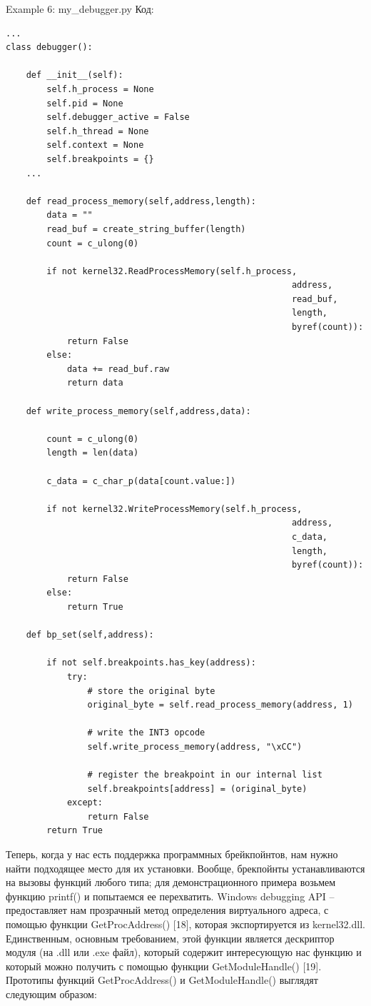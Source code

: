 \documentclass[12pt]{book}
\begin{document}
Example 6: my\_debugger.py
Код:
\begin{lstlisting}
...
class debugger():

    def __init__(self):
        self.h_process = None
        self.pid = None
        self.debugger_active = False
        self.h_thread = None
        self.context = None
        self.breakpoints = {}
    ...

    def read_process_memory(self,address,length):
        data = ""
        read_buf = create_string_buffer(length)
        count = c_ulong(0)

        if not kernel32.ReadProcessMemory(self.h_process,
                                                        address,
                                                        read_buf,
                                                        length,
                                                        byref(count)):
            return False
        else:
            data += read_buf.raw
            return data

    def write_process_memory(self,address,data):

        count = c_ulong(0)
        length = len(data)

        c_data = c_char_p(data[count.value:])

        if not kernel32.WriteProcessMemory(self.h_process,
                                                        address,
                                                        c_data,
                                                        length,
                                                        byref(count)):
            return False
        else:
            return True

    def bp_set(self,address):

        if not self.breakpoints.has_key(address):
            try:
                # store the original byte
                original_byte = self.read_process_memory(address, 1)

                # write the INT3 opcode
                self.write_process_memory(address, "\xCC")

                # register the breakpoint in our internal list
                self.breakpoints[address] = (original_byte)
            except:
                return False
        return True
\end{lstlisting}

Теперь, когда у нас есть поддержка программных брейкпойнтов, нам нужно найти подходящее место для их установки. Вообще, брекпойнты устанавливаются на вызовы функций любого типа; для демонстрационного примера возьмем функцию printf() и попытаемся ее перехватить. Windows debugging API – предоставляет нам прозрачный метод определения виртуального адреса, с помощью функции GetProcAddress() [18], которая экспортируется из kernel32.dll. Единственным, основным требованием, этой функции является дескриптор модуля (на .dll или .exe файл), который содержит интересующую нас функцию и который можно получить с помощью функции GetModuleHandle() [19]. Прототипы функций GetProcAddress() и GetModuleHandle() выглядят следующим образом:
\end{document}
